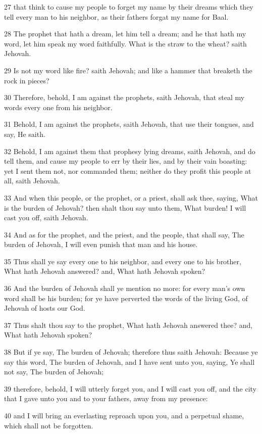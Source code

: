 \par 27 that think to cause my people to forget my name by their dreams which they tell every man to his neighbor, as their fathers forgat my name for Baal.
\par 28 The prophet that hath a dream, let him tell a dream; and he that hath my word, let him speak my word faithfully. What is the straw to the wheat? saith Jehovah.
\par 29 Is not my word like fire? saith Jehovah; and like a hammer that breaketh the rock in pieces?
\par 30 Therefore, behold, I am against the prophets, saith Jehovah, that steal my words every one from his neighbor.
\par 31 Behold, I am against the prophets, saith Jehovah, that use their tongues, and say, He saith.
\par 32 Behold, I am against them that prophesy lying dreams, saith Jehovah, and do tell them, and cause my people to err by their lies, and by their vain boasting: yet I sent them not, nor commanded them; neither do they profit this people at all, saith Jehovah.
\par 33 And when this people, or the prophet, or a priest, shall ask thee, saying, What is the burden of Jehovah? then shalt thou say unto them, What burden! I will cast you off, saith Jehovah.
\par 34 And as for the prophet, and the priest, and the people, that shall say, The burden of Jehovah, I will even punish that man and his house.
\par 35 Thus shall ye say every one to his neighbor, and every one to his brother, What hath Jehovah answered? and, What hath Jehovah spoken?
\par 36 And the burden of Jehovah shall ye mention no more: for every man's own word shall be his burden; for ye have perverted the words of the living God, of Jehovah of hosts our God.
\par 37 Thus shalt thou say to the prophet, What hath Jehovah answered thee? and, What hath Jehovah spoken?
\par 38 But if ye say, The burden of Jehovah; therefore thus saith Jehovah: Because ye say this word, The burden of Jehovah, and I have sent unto you, saying, Ye shall not say, The burden of Jehovah;
\par 39 therefore, behold, I will utterly forget you, and I will cast you off, and the city that I gave unto you and to your fathers, away from my presence:
\par 40 and I will bring an everlasting reproach upon you, and a perpetual shame, which shall not be forgotten.

